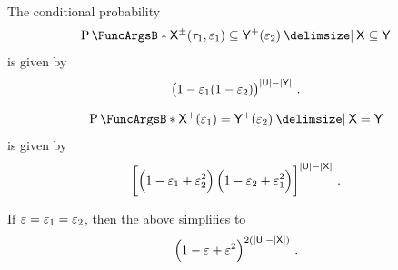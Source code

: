 \documentclass[11pt,final,hidelinks]{article}
\begin{document}
The conditional probability
\begin{equation}
\Prob{\ASet{X}(\tprate_1,\fprate_1) \subseteq \PASet{Y}(\fprate_2) \Given \Set{X} \subseteq \Set{Y}}
\end{equation}
is given by
\begin{equation}
\left(1 - \fprate_1(1 - \fprate_2)\right)^{\Card{\Set{U}} - \Card{\Set{Y}}}\,.
\end{equation}


\begin{equation}
\Prob{\PASet{X}(\fprate_1) = \PASet{Y}(\fprate_2) \Given \Set{X} = \Set{Y}}
\end{equation}
is given by
\begin{equation}
\left[\left(1 - \fprate_1 + \fprate_2^2\right)\left(1 - \fprate_2 + \fprate_1^2\right)\right]^{\Card{\Set{U}} - \Card{\Set{X}}}\,.
\end{equation}

If $\varepsilon = \varepsilon_1 = \varepsilon_2$, then the above simplifies to
\begin{equation}
\left(1 - \fprate + \fprate^2\right)^{2 (\Card{\Set{U}} - \Card{\Set{X}})}\,.
\end{equation}





\end{document}
